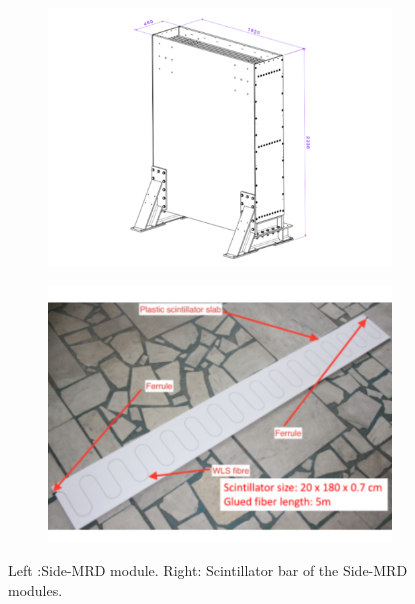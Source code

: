 \begin{figure}[tbhp]
  \begin{center}
   \begin{subfigure}{0.58\textwidth}
     \includegraphics[width=\linewidth]{fig/side_mrd_structure.pdf}
    \end{subfigure}
  \begin{subfigure}{0.4\textwidth}
      \includegraphics[width=\linewidth]{fig/side_mrd_scintillator.pdf}
    \end{subfigure}    
    \end{center}
  \caption{Left :Side-MRD module. Right: Scintillator bar of the Side-MRD modules.
}
\label{fig:side_mrd}
\end{figure}


